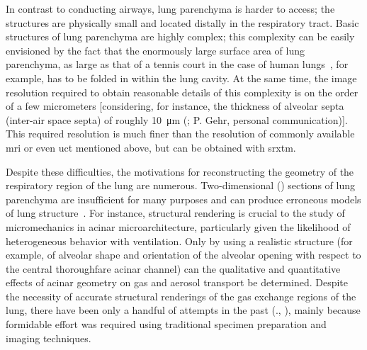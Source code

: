 In contrast to conducting airways, lung parenchyma is harder to access; the structures are physically small and located distally in the respiratory tract. Basic structures of lung parenchyma are highly complex; this complexity can be easily envisioned by the fact that the enormously large surface area of lung parenchyma, as large as that of a tennis court in the case of human lungs~\cite{Gehr1978,Weibel1963}, for example, has to be folded in within the lung cavity. At the same time, the image resolution required to obtain reasonable details of this complexity is on the order of a few micrometers [considering, for instance, the thickness of alveolar septa (inter-air space septa) of roughly \SI{10}{\micro\meter} (\cite{Gehr1978}; P. Gehr, personal communication)]. This required resolution is much finer than the resolution of commonly available \ac{mri} or even \ac{uct} mentioned above, but can be obtained with \ac{srxtm}.

Despite these difficulties, the motivations for reconstructing the \threed geometry of the respiratory region of the lung are numerous. Two-dimensional (\twod) sections of lung parenchyma are insufficient for many purposes and can produce erroneous models of lung structure~\cite{Cookson1993}. For instance, \threed structural rendering is crucial to the study of micromechanics in \threed acinar microarchitecture, particularly given the likelihood of heterogeneous behavior with ventilation. Only by using a realistic \threed structure (for example, of alveolar shape and orientation of the alveolar opening with respect to the central thoroughfare acinar channel) can the qualitative and quantitative effects of \threed acinar geometry on gas and aerosol transport be determined. Despite the necessity of accurate \threed structural renderings of the gas exchange regions of the lung, there have been only a handful of attempts in the past (\eg., \cite{Berend1991,Cookson1993,Honda2002,Litzlbauer2006,Mercer1987,Randell1989,Stelter1966,Watz2005}), mainly because formidable effort was required using traditional specimen preparation and imaging techniques.

